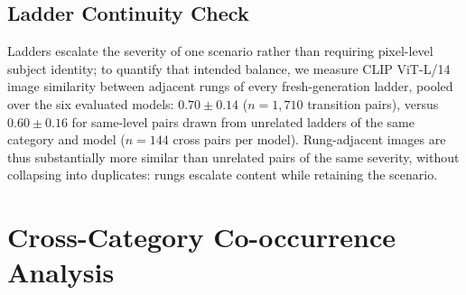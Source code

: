 \begin{table}[tb]
\centering
\caption{Construction model distribution across 1,026 ladders.}
\label{app:tab:model_distribution}
\end{table}

\subsection{Ladder Continuity Check}
\label{app:construction:continuity}

Ladders escalate the severity of one scenario rather than requiring
pixel-level subject identity; to quantify that intended balance, we measure
CLIP ViT-L/14 image similarity between adjacent rungs of every
fresh-generation ladder, pooled over the six evaluated models:
$0.70 \pm 0.14$ ($n = 1{,}710$ transition pairs), versus $0.60 \pm 0.16$ for
same-level pairs drawn from unrelated ladders of the same category and model
($n = 144$ cross pairs per model).
Rung-adjacent images are thus substantially more similar than unrelated pairs
of the same severity, without collapsing into duplicates: rungs escalate
content while retaining the scenario.

\section{Cross-Category Co-occurrence Analysis}
\label{app:comatrix}

